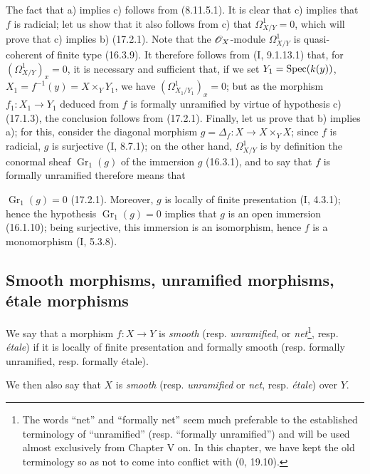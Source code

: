 The fact that a) implies c) follows from (8.11.5.1). It is clear that c) implies that $f$ is radicial; let us show that it also follows from c) that $\Omega_{X/Y}^1=0$, which will prove that c) implies b) (17.2.1). Note that the $\mathscr{O}_X$-module $\Omega_{X/Y}^1$ is quasi-coherent of finite type (16.3.9). It therefore follows from (I, 9.1.13.1) that, for $(\Omega_{X/Y}^1)_x=0$, it is necessary and sufficient that, if we set $Y_1=\operatorname{Spec}(k(y))$, $X_1=f^{-1}(y)=X\times_Y Y_1$, we have $(\Omega_{X_1/Y_1}^1)_x=0$; but as the morphism $f_1:X_1\to Y_1$ deduced from $f$ is formally unramified by virtue of hypothesis c) (17.1.3), the conclusion follows from (17.2.1). Finally, let us prove that b) implies a); for this, consider the diagonal morphism $g=\Delta_f:X\to X\times_Y X$; since $f$ is radicial, $g$ is surjective (I, 8.7.1); on the other hand, $\Omega_{X/Y}^1$ is by definition the conormal sheaf $\mathop{Gr}\nolimits_1(g)$ of the immersion $g$ (16.3.1), and to say that $f$ is formally unramified therefore means that

$\mathop{Gr}\nolimits_1(g)=0$ (17.2.1). Moreover, $g$ is locally of finite presentation (I, 4.3.1); hence the hypothesis $\mathop{Gr}\nolimits_1(g)=0$ implies that $g$ is an open immersion (16.1.10); being surjective, this immersion is an isomorphism, hence $f$ is a monomorphism (I, 5.3.8).

\subsection{Smooth morphisms, unramified morphisms, étale morphisms}

\begin{definition}[17.3.1]\label{IV.17.3.1}
We say that a morphism $f:X\to Y$ is \emph{smooth} (resp. \emph{unramified}, or \emph{net}\footnote{The words ``net'' and ``formally net'' seem much preferable to the established terminology of ``unramified'' (resp. ``formally unramified'') and will be used almost exclusively from Chapter V on. In this chapter, we have kept the old terminology so as not to come into conflict with (0, 19.10).}, resp. \emph{étale}) if it is locally of finite presentation and formally smooth (resp. formally unramified, resp. formally étale).
\end{definition}

We then also say that $X$ is \emph{smooth} (resp. \emph{unramified} or \emph{net}, resp. \emph{étale}) over $Y$.

